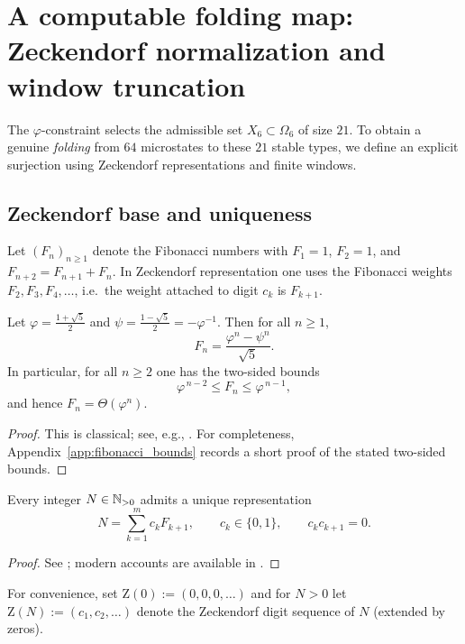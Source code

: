 
\section{A computable folding map: Zeckendorf normalization and window truncation}
\label{sec:fold_map}

The $\varphi$-constraint selects the admissible set $X_6\subset\Omega_6$ of size $21$.
To obtain a genuine \emph{folding} from $64$ microstates to these $21$ stable types, we define an explicit surjection using Zeckendorf representations and finite windows.

\subsection{Zeckendorf base and uniqueness}
Let $(F_n)_{n\ge 1}$ denote the Fibonacci numbers with $F_1=1$, $F_2=1$, and $F_{n+2}=F_{n+1}+F_n$.
In Zeckendorf representation one uses the Fibonacci weights $F_2,F_3,F_4,\dots$, i.e.\ the weight attached to digit $c_k$ is $F_{k+1}$.

\begin{lemma}
\label{lem:binet_bounds}
Let $\varphi=\frac{1+\sqrt{5}}{2}$ and $\psi=\frac{1-\sqrt{5}}{2}=-\varphi^{-1}$.
Then for all $n\ge 1$,
\[
F_n=\frac{\varphi^n-\psi^n}{\sqrt{5}}.
\]
In particular, for all $n\ge 2$ one has the two-sided bounds
\[
\varphi^{\,n-2}\le F_n\le \varphi^{\,n-1},
\]
and hence $F_n=\Theta(\varphi^n)$.
\end{lemma}

\begin{proof}
This is classical; see, e.g., \cite{Koshy2001}.
For completeness, Appendix~\ref{app:fibonacci_bounds} records a short proof of the stated two-sided bounds.
\end{proof}

\begin{theorem}
\label{thm:zeckendorf_uniqueness}
Every integer $N\in\mathbb{N}_{>0}$ admits a unique representation
\[
N=\sum_{k=1}^{m} c_k F_{k+1},
\qquad c_k\in\{0,1\},\qquad c_k c_{k+1}=0.
\]
\end{theorem}

\begin{proof}
See \cite{Zeckendorf1972}; modern accounts are available in \cite{AlloucheShallit2003,Lothaire2002}.
\end{proof}

For convenience, set $\mathrm{Z}(0):=(0,0,0,\dots)$ and for $N>0$ let $\mathrm{Z}(N):=(c_1,c_2,\dots)$ denote the Zeckendorf digit sequence of $N$ (extended by zeros).

